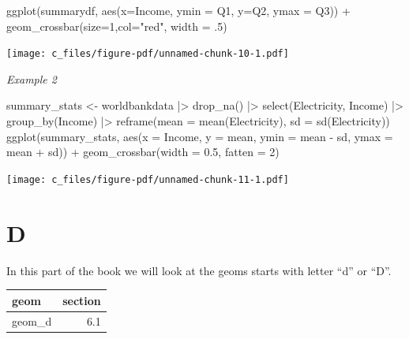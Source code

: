 \documentclass[
  letterpaper,
  DIV=11,
  numbers=noendperiod]{scrreprt}
\newenvironment{Shaded}{\begin{snugshade}}{\end{snugshade}}
\newcommand{\AttributeTok}[1]{\textcolor[rgb]{0.40,0.45,0.13}{#1}}
\newcommand{\DecValTok}[1]{\textcolor[rgb]{0.68,0.00,0.00}{#1}}
\newcommand{\FloatTok}[1]{\textcolor[rgb]{0.68,0.00,0.00}{#1}}
\newcommand{\FunctionTok}[1]{\textcolor[rgb]{0.28,0.35,0.67}{#1}}
\newcommand{\NormalTok}[1]{\textcolor[rgb]{0.00,0.23,0.31}{#1}}
\newcommand{\OtherTok}[1]{\textcolor[rgb]{0.00,0.23,0.31}{#1}}
\newcommand{\SpecialCharTok}[1]{\textcolor[rgb]{0.37,0.37,0.37}{#1}}
\newcommand{\StringTok}[1]{\textcolor[rgb]{0.13,0.47,0.30}{#1}}
\begin{document}
\begin{Shaded}
\begin{Highlighting}[]
\FunctionTok{ggplot}\NormalTok{(summarydf, }\FunctionTok{aes}\NormalTok{(}\AttributeTok{x=}\NormalTok{Income, }\AttributeTok{ymin =}\NormalTok{ Q1, }\AttributeTok{y=}\NormalTok{Q2, }\AttributeTok{ymax =}\NormalTok{ Q3)) }\SpecialCharTok{+} 
  \FunctionTok{geom\_crossbar}\NormalTok{(}\AttributeTok{size=}\DecValTok{1}\NormalTok{,}\AttributeTok{col=}\StringTok{"red"}\NormalTok{, }\AttributeTok{width =}\NormalTok{ .}\DecValTok{5}\NormalTok{)}
\end{Highlighting}
\end{Shaded}

\texttt{[image: c\_files/figure-pdf/unnamed-chunk-10-1.pdf]}

\emph{Example 2}

\begin{Shaded}
\begin{Highlighting}[]
\NormalTok{summary\_stats }\OtherTok{\textless{}{-}}\NormalTok{ worldbankdata }\SpecialCharTok{|\textgreater{}}
  \FunctionTok{drop\_na}\NormalTok{() }\SpecialCharTok{|\textgreater{}}
  \FunctionTok{select}\NormalTok{(Electricity, Income) }\SpecialCharTok{|\textgreater{}}
  \FunctionTok{group\_by}\NormalTok{(Income) }\SpecialCharTok{|\textgreater{}}
  \FunctionTok{reframe}\NormalTok{(}\AttributeTok{mean =} \FunctionTok{mean}\NormalTok{(Electricity),}
          \AttributeTok{sd =} \FunctionTok{sd}\NormalTok{(Electricity)) }
\FunctionTok{ggplot}\NormalTok{(summary\_stats, }\FunctionTok{aes}\NormalTok{(}\AttributeTok{x =}\NormalTok{ Income, }\AttributeTok{y =}\NormalTok{ mean, }\AttributeTok{ymin =}\NormalTok{ mean }\SpecialCharTok{{-}}\NormalTok{ sd, }\AttributeTok{ymax =}\NormalTok{ mean }\SpecialCharTok{+}\NormalTok{ sd)) }\SpecialCharTok{+}
  \FunctionTok{geom\_crossbar}\NormalTok{(}\AttributeTok{width =} \FloatTok{0.5}\NormalTok{, }\AttributeTok{fatten =} \DecValTok{2}\NormalTok{) }
\end{Highlighting}
\end{Shaded}

\texttt{[image: c\_files/figure-pdf/unnamed-chunk-11-1.pdf]}

\part{D}

In this part of the book we will look at the geoms starts with letter
``d'' or ``D''.

\begin{longtable}[]{@{}lr@{}}
\toprule\noalign{}
geom & section \\
\midrule\noalign{}
\endhead
\bottomrule\noalign{}
\endlastfoot
geom\_d & 6.1 \\
\end{longtable}
\end{document}
